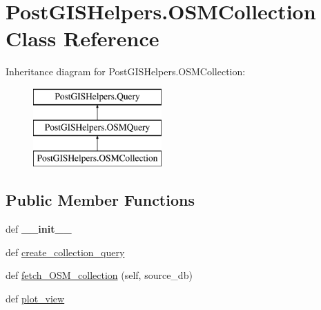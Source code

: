 \hypertarget{class_post_g_i_s_helpers_1_1_o_s_m_collection}{}\section{Post\+G\+I\+S\+Helpers.\+O\+S\+M\+Collection Class Reference}
\label{class_post_g_i_s_helpers_1_1_o_s_m_collection}
Inheritance diagram for Post\+G\+I\+S\+Helpers.\+O\+S\+M\+Collection\+:\begin{figure}[H]
\begin{center}
\leavevmode
\includegraphics[height=3.000000cm]{class_post_g_i_s_helpers_1_1_o_s_m_collection}
\end{center}
\end{figure}
\subsection*{Public Member Functions}
\begin{DoxyCompactItemize}
\item 
\hypertarget{class_post_g_i_s_helpers_1_1_o_s_m_collection_a52bcf3a425fb5dd150a7c6c2efe0424b}{}def {\bfseries \+\_\+\+\_\+init\+\_\+\+\_\+}\label{class_post_g_i_s_helpers_1_1_o_s_m_collection_a52bcf3a425fb5dd150a7c6c2efe0424b}

\item 
def \hyperlink{class_post_g_i_s_helpers_1_1_o_s_m_collection_af97c78e59020dafe7f277b828adf8d6e}{create\+\_\+collection\+\_\+query}
\item 
def \hyperlink{class_post_g_i_s_helpers_1_1_o_s_m_collection_ae422d255640aa558aa826f4a30e8aeb1}{fetch\+\_\+\+O\+S\+M\+\_\+collection} (self, source\+\_\+db)
\item 
def \hyperlink{class_post_g_i_s_helpers_1_1_o_s_m_collection_ae505c01a43a32c63bba81f7b1424bc11}{plot\+\_\+view}
\end{DoxyCompactItemize}
